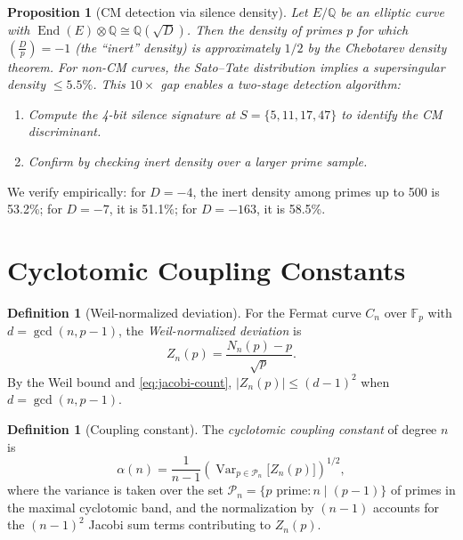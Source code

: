 \documentclass[11pt]{amsart}
\newtheorem{proposition}[theorem]{Proposition}
\theoremstyle{definition}
\newtheorem{definition}[theorem]{Definition}
\begin{document}
\begin{proposition}[CM detection via silence density]\label{prop:cm}
Let $E/\mathbb{Q}$ be an elliptic curve with $\operatorname{End}(E) \otimes \mathbb{Q} \cong \mathbb{Q}(\sqrt{D})$. Then the density of primes $p$ for which $\left(\frac{D}{p}\right) = -1$ (the ``inert'' density) is approximately $1/2$ by the Chebotarev density theorem. For non-CM curves, the Sato--Tate distribution implies a supersingular density $\leq 5.5\%$. This $10\times$ gap enables a two-stage detection algorithm:
\begin{enumerate}[label=(\arabic*)]
\item Compute the 4-bit silence signature at $S = \{5, 11, 17, 47\}$ to identify the CM discriminant.
\item Confirm by checking inert density over a larger prime sample.
\end{enumerate}
\end{proposition}

We verify empirically: for $D = -4$, the inert density among primes up to 500 is 53.2\%; for $D = -7$, it is 51.1\%; for $D = -163$, it is 58.5\%.


\section{Cyclotomic Coupling Constants}
\label{sec:coupling}

\begin{definition}[Weil-normalized deviation]\label{def:Z}
For the Fermat curve $C_n$ over $\mathbb{F}_p$ with $d = \gcd(n, p-1)$, the \emph{Weil-normalized deviation} is
\[
Z_n(p) = \frac{N_n(p) - p}{\sqrt{p}}.
\]
By the Weil bound and \eqref{eq:jacobi-count}, $|Z_n(p)| \leq (d-1)^2$ when $d = \gcd(n, p-1)$.
\end{definition}

\begin{definition}[Coupling constant]\label{def:coupling}
The \emph{cyclotomic coupling constant} of degree $n$ is
\[
\alpha(n) = \frac{1}{n-1}\left(\operatorname{Var}_{p \in \mathcal{P}_n}\bigl[Z_n(p)\bigr]\right)^{1/2},
\]
where the variance is taken over the set $\mathcal{P}_n = \{p \text{ prime} : n \mid (p-1)\}$ of primes in the maximal cyclotomic band, and the normalization by $(n-1)$ accounts for the $(n-1)^2$ Jacobi sum terms contributing to $Z_n(p)$.
\end{definition}
\end{document}
